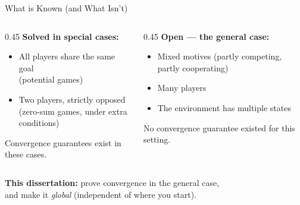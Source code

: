 \documentclass[aspectratio=169,11pt]{beamer}
\begin{document}
\begin{frame}{What is Known (and What Isn't)}
  \begin{columns}[c]
    \begin{column}{0.45\textwidth}
      \textbf{Solved in special cases:}
      \begin{itemize}
        \item All players share the same goal \\ {\small(potential games)}
        \item Two players, strictly opposed \\ {\small(zero-sum games, under extra conditions)}
      \end{itemize}
      \medskip
      Convergence guarantees exist in these cases.
    \end{column}
    \begin{column}{0.45\textwidth}
      \textbf{Open --- the general case:}
      \begin{itemize}
        \item Mixed motives (partly competing, partly cooperating)
        \item Many players
        \item The environment has multiple states
      \end{itemize}
      \medskip
      No convergence guarantee existed for this setting.
    \end{column}
  \end{columns}

  \bigskip

  \begin{center}
    \textbf{This dissertation:} prove convergence in the general case,\\
    and make it \emph{global} (independent of where you start).
  \end{center}
\end{frame}
\end{document}
